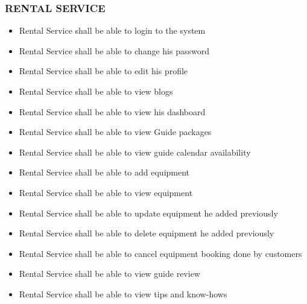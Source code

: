 \subsubsection*{RENTAL SERVICE}
\begin{itemize}
\itemsep0em 
    \item Rental Service shall be able to login to the system
    \item Rental Service shall be able to change his password 
    \item Rental Service shall be able to edit his profile
    \item Rental Service shall be able to view blogs
    \item Rental Service shall be able to view his dashboard
    \item Rental Service shall be able to view Guide packages
    \item Rental Service shall be able to view guide calendar availability
    \item Rental Service shall be able to add equipment
    \item Rental Service shall be able to view equipment
    \item Rental Service shall be able to update equipment he added previously 
    \item Rental Service shall be able to delete equipment  he added previously
    \item Rental Service shall be able to cancel equipment booking done by customers
    \item Rental Service shall be able to view guide review
    \item Rental Service shall be able to view tips and know-hows
\end{itemize}

